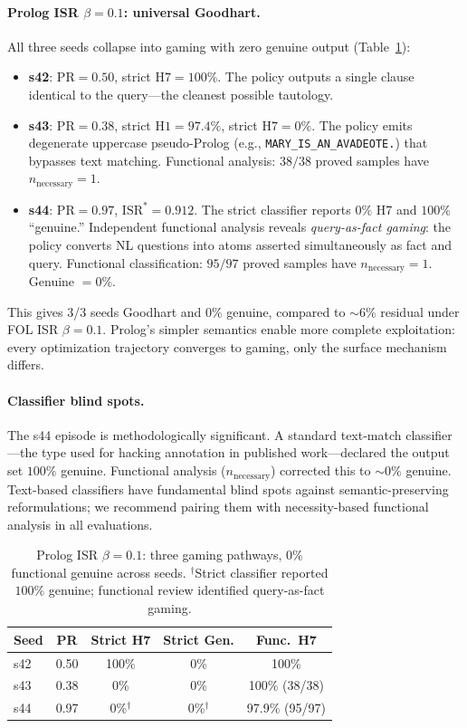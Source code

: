 \paragraph{Prolog ISR $\beta{=}0.1$: universal Goodhart.}
All three seeds collapse into gaming with zero genuine output (Table~\ref{tab:prolog-cross}):
\begin{itemize}\itemsep0pt
  \item \textbf{s42}: $\mathrm{PR}{=}0.50$, strict $\mathrm{H7}{=}100\%$. The policy outputs a single clause identical to the query---the cleanest possible tautology.
  \item \textbf{s43}: $\mathrm{PR}{=}0.38$, strict $\mathrm{H1}{=}97.4\%$, strict $\mathrm{H7}{=}0\%$. The policy emits degenerate uppercase pseudo-Prolog (e.g., \texttt{MARY\_IS\_AN\_AVADEOTE.}) that bypasses text matching. Functional analysis: $38/38$ proved samples have $n_\mathrm{necessary}{=}1$.
  \item \textbf{s44}: $\mathrm{PR}{=}0.97$, $\mathrm{ISR}^*{=}0.912$. The strict classifier reports $0\%$ H7 and $100\%$ ``genuine.'' Independent functional analysis reveals \emph{query-as-fact gaming}: the policy converts NL questions into atoms asserted simultaneously as fact and query. Functional classification: $95/97$ proved samples have $n_\mathrm{necessary}{=}1$. Genuine $= 0\%$.
\end{itemize}
This gives 3/3 seeds Goodhart and $0\%$ genuine, compared to ${\sim}6\%$ residual under FOL ISR $\beta{=}0.1$.
Prolog's simpler semantics enable more complete exploitation: every optimization trajectory converges to gaming, only the surface mechanism differs.

\paragraph{Classifier blind spots.}
The s44 episode is methodologically significant.
A standard text-match classifier---the type used for hacking annotation in published work---declared the output set $100\%$ genuine.
Functional analysis ($n_\mathrm{necessary}$) corrected this to ${\sim}0\%$ genuine.
Text-based classifiers have fundamental blind spots against semantic-preserving reformulations; we recommend pairing them with necessity-based functional analysis in all evaluations.

\begin{table}[t]
\centering\small
\begin{tabular}{lcccc}
\toprule
\textbf{Seed} & \textbf{PR} & \textbf{Strict H7} & \textbf{Strict Gen.} & \textbf{Func.\ H7} \\
\midrule
s42 & 0.50 & 100\%      & 0\%    & 100\% \\
s43 & 0.38 & 0\%        & 0\%    & 100\% (38/38) \\
s44 & 0.97 & 0\%$^\dagger$ & 0\%$^\dagger$ & 97.9\% (95/97) \\
\bottomrule
\end{tabular}
\caption{Prolog ISR $\beta{=}0.1$: three gaming pathways, $0\%$ functional genuine across seeds. $^\dagger$Strict classifier reported $100\%$ genuine; functional review identified query-as-fact gaming.}
\label{tab:prolog-cross}
\end{table}

